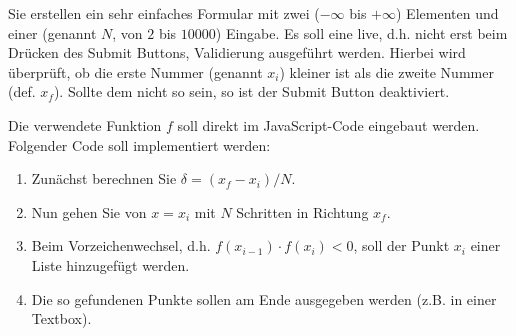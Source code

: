 %
\par Sie erstellen ein sehr einfaches Formular mit zwei 
($-\infty$ bis $+\infty$) Elementen und einer  (genannt $N$,
von $2$ bis $10000$) Eingabe. Es soll eine live, d.h. nicht erst beim Drücken
des Submit Buttons, Validierung ausgeführt werden. Hierbei wird überprüft, ob
die erste Nummer (genannt $x_i$) kleiner ist als die zweite Nummer (def.
$x_f$). Sollte dem nicht so sein, so ist der Submit Button deaktiviert.
%
\par Die verwendete Funktion $f$ soll direkt im JavaScript-Code eingebaut
werden. Folgender Code soll implementiert werden:
%
\begin{enumerate}
\item
Zunächst berechnen Sie $\delta = (x_f - x_i)/N$.
\item
Nun gehen Sie von $x=x_i$ mit $N$ Schritten in Richtung $x_f$.
\item
Beim Vorzeichenwechsel, d.h. $f(x_{i - 1}) \cdot f(x_i) < 0$, soll der Punkt
$x_i$ einer Liste hinzugefügt werden.
\item
Die so gefundenen Punkte sollen am Ende ausgegeben werden (z.B. in einer
Textbox).
\end{enumerate}